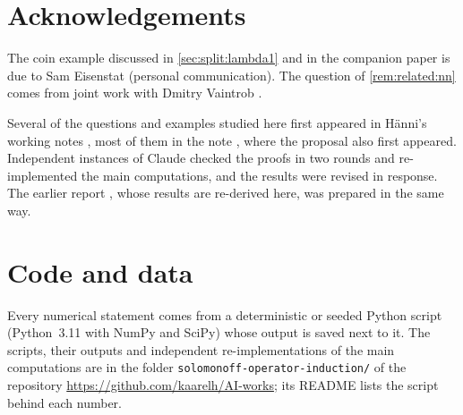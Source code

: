 \section*{Acknowledgements}
The coin example discussed in \cref{sec:split:lambda1} and in the companion paper is due to Sam Eisenstat (personal communication). The question of \cref{rem:related:nn} comes from joint work with Dmitry Vaintrob \citep{vaintrobhanni2026nnbayes}.

Several of the questions and examples studied here first appeared in H\"anni's working notes \citep{hanni2026notes}, most of them in the note \citep{hanni2026grokking}, where the proposal also first appeared. Independent instances of Claude checked the proofs in two rounds and re-implemented the main computations, and the results were revised in response. The earlier report \citep{claude2026whatfollows}, whose results are re-derived here, was prepared in the same way.

\section*{Code and data}
Every numerical statement comes from a deterministic or seeded Python script (Python~3.11 with NumPy and SciPy) whose output is saved next to it. The scripts, their outputs and independent re-implementations of the main computations are in the folder \texttt{solomonoff-operator-induction/} of the repository \url{https://github.com/kaarelh/AI-works}; its README lists the script behind each number.
